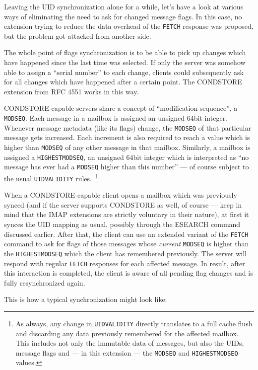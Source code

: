 \documentclass[trojita]{subfiles}
\begin{document}
Leaving the UID synchronization alone for a while, let's have a look at various ways of eliminating the need to ask for
changed message flags.  In this case, no extension trying to reduce the data overhead of the {\tt FETCH} response was
proposed, but the problem got attacked from another side.

The whole point of flags synchronization is to be able to pick up changes which have happened since the last time was
selected.  If only the server was somehow able to assign a ``serial number'' to each change, clients could subsequently
ask for all changes which have happened after a certain point.  The CONDSTORE extension from RFC 4551 \cite{rfc4551}
works in this way.

CONDSTORE-capable servers share a concept of ``modification sequence'', a {\tt MODSEQ}.  Each message in a mailbox is
assigned an unsigned 64bit integer.  Whenever message metadata (like its flags) change, the {\tt MODSEQ} of that
particular message gets increased.  Each increment is also required to reach a value which is higher than {\tt MODSEQ}
of any other message in that mailbox.  Similarly, a mailbox is assigned a {\tt HIGHESTMODSEQ}, an unsigned 64bit integer
which is interpreted as ``no message has ever had a {\tt MODSEQ} higher than this number'' --- of course subject to the
usual {\tt UIDVALIDITY} rules.~\footnote{As always, any change in {\tt UIDVALIDITY} directly translates to a full cache
flush and discarding any data previously remembered for the affected mailbox.  This includes not only the immutable data
of messages, but also the UIDs, message flags and --- in this extension --- the {\tt MODSEQ} and {\tt HIGHESTMODSEQ}
values.}

When a CONDSTORE-capable client opens a mailbox which was previously synced (and if the server supports CONDSTORE as
well, of course --- keep in mind that the IMAP extensions are strictly voluntary in their nature), at first it synces the
UID mapping as usual, possibly through the ESEARCH command discussed earlier.  After that, the client can use an
extended variant of the {\tt FETCH} command to ask for flags of those messages whose {\em current} {\tt MODSEQ} is
higher than the {\tt HIGHESTMODSEQ} which the client has remembered previously.  The server will respond with regular
{\tt FETCH} responses for each affected message.  In result, after this interaction is completed, the client is aware of
all pending flag changes and is fully resynchronized again.

This is how a typical synchronization might look like:
\end{document}
